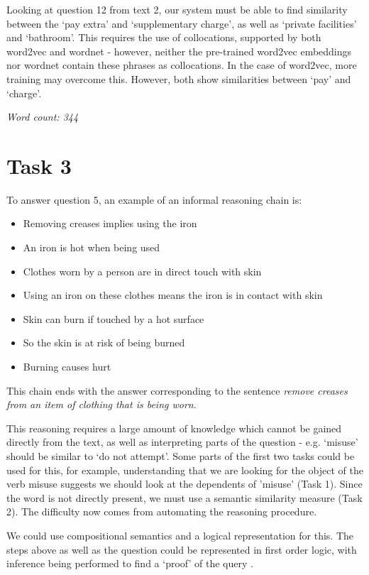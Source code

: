 \documentclass[12pt,a4paper]{article}
\begin{document}
Looking at question 12 from text 2, our system must be able to find similarity between the `pay extra' and `supplementary charge', as well as `private facilities' and `bathroom'. This requires the use of collocations, supported by both word2vec and wordnet - however, neither the pre-trained word2vec embeddings nor wordnet contain these phrases as collocations. In the case of word2vec, more training may overcome this. However, both show similarities between `pay' and `charge'.

\textit{Word count: 344}

\section*{Task 3}

To answer question 5, an example of an informal reasoning chain is:

\begin{itemize}
    \item Removing creases implies using the iron
    \item An iron is hot when being used
    \item Clothes worn by a person are in direct touch with skin
    \item Using an iron on these clothes means the iron is in contact with skin
    \item Skin can burn if touched by a hot surface
    \item So the skin is at risk of being burned
    \item Burning causes hurt
\end{itemize}

This chain ends with the answer corresponding to the sentence \textit{remove creases from an item of clothing that is being worn}.

This reasoning requires a large amount of knowledge which cannot be gained directly from the text, as well as interpreting parts of the question - e.g. `misuse' should be similar to `do not attempt'. Some parts of the first two tasks could be used for this, for example, understanding that we are looking for the object of the verb misuse suggests we should look at the dependents of 'misuse' (Task 1). Since the word is not directly present, we must use a semantic similarity measure (Task 2). The difficulty now comes from automating the reasoning procedure. 

We could use compositional semantics and a logical representation for this. The steps above as well as the question could be represented in first order logic, with inference being performed to find a `proof' of the query \cite{NLP_lec6}.
\end{document}
